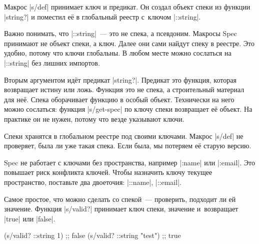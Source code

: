
Макрос \spverb|s/def| принимает ключ и предикат. Он создал объект спеки из
функции \spverb|string?| и поместил е\"{е} в глобальный реестр с~ключом
\spverb|::string|.

Важно понимать, что \spverb|::string|~--- это не спека, а псевдоним. Макросы
Spec принимают не объект спеки, а ключ. Далее они сами найдут спеку в
реестре. Это удобно, потому что ключи глобальны. В любом месте можно сослаться
на \spverb|::string| без лишних импортов.


Вторым аргументом ид\"{е}т предикат \spverb|string?|. Предикат это функция, которая
возвращает истину или ложь. Функция это не спека, а строительный материал для
не\"{е}. Спека оборачивает функцию в особый объект. Технически на него можно
сослаться: функция \spverb|s/get-spec| по ключу спеки возвращает е\"{е} объект. На
практике он не нужен, потому что везде указывают ключи.

\begin{english}
\end{english}


Спеки хранятся в глобальном реестре под своими ключами. Макрос \spverb|s/def| не
проверяет, была ли уже такая спека. Если была, мы потеряем е\"{е} старую версию.


Spec не работает с ключами без пространства, например \spverb|:name| или
\spverb|:email|. Это повышает риск конфликта ключей. Чтобы назначить ключу
текущее пространство, поставьте два двоеточия: \spverb|::name|, \spverb|::email|.


Самое простое, что можно сделать со спекой~--- проверить, подходит ли ей
значение. Функция \spverb|s/valid?| принимает ключ спеки, значение и~возвращает
\spverb|true| или \spverb|false|.

\begin{english}
  \begin{clojure}
(s/valid? ::string 1)      ;; false
(s/valid? ::string "test") ;; true
  \end{clojure}
\end{english}

